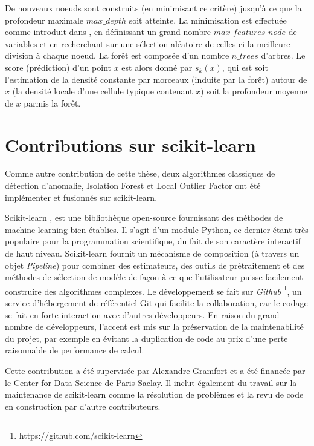 \documentclass[a4paper, 12pt]{article}
\begin{document}
De nouveaux noeuds sont construits (en minimisant ce critère) jusqu'à ce que la profondeur maximale $ max\_depth $ soit atteinte.
La minimisation est effectuée comme introduit dans \citep{Amit1997}, en définissant un grand nombre $max\_features\_node $ de variables et en recherchant sur une sélection aléatoire de celles-ci la meilleure division à chaque noeud. La forêt est composée d'un nombre $n\_trees$ d'arbres. Le score (prédiction) d'un point $x$ est alors donné par $s_k(x)$, qui est soit l'estimation de la densité constante par morceaux (induite par la forêt) autour de $x$ (la densité locale d'une cellule typique contenant $x$) soit la profondeur moyenne de $x$ parmis la forêt. 


\section{Contributions sur scikit-learn}
\label{resume_fr:sec:impl}

Comme autre contribution de cette thèse, deux algorithmes classiques de détection d'anomalie, Isolation Forest et Local Outlier Factor ont été implémenter et fusionnés sur scikit-learn. 

Scikit-learn \citep{sklearn2011}, est une bibliothèque open-source fournissant des méthodes de machine learning bien établies. Il s'agit d'un module Python, ce dernier étant très populaire pour la programmation scientifique, du fait de son caractère interactif de haut niveau. Scikit-learn fournit un mécanisme de composition (à travers un objet \emph{Pipeline}) pour combiner des estimateurs, des outils de prétraitement et des méthodes de sélection de modèle de façon à ce que l'utilisateur puisse facilement construire des algorithmes complexes. Le développement se fait sur \emph{Github} \footnote{https://github.com/scikit-learn}, un service d'hébergement de référentiel Git qui facilite la collaboration, car le codage se fait en forte interaction avec d'autres développeurs. En raison du grand nombre de développeurs, l'accent est mis sur la préservation de la maintenabilité du projet, par exemple en évitant la duplication de code au prix d'une perte raisonnable de performance de calcul.

Cette contribution a été supervisée par Alexandre Gramfort et a été financée par le Center for Data Science de Paris-Saclay. Il inclut également du travail sur la maintenance de scikit-learn comme la résolution de problèmes et la revu de code en construction par d'autre contributeurs. %
\end{document}
